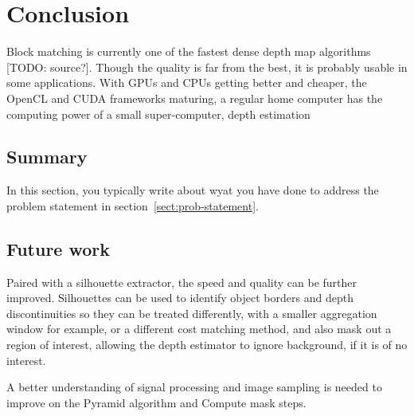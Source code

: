 \chapter{Conclusion}\label{chap:concl}

Block matching is currently one of the fastest dense depth map algorithms
[TODO: source?]. Though the quality is far from the best, it is probably
usable in some applications. With GPUs and CPUs getting better and cheaper,
the OpenCL and CUDA frameworks maturing, a regular home computer has the
computing power of a small super-computer, depth estimation

\section{Summary}

In this section, you typically write about wyat you have done to address the
problem statement in section~\ref{sect:prob-statement}.



\section{Future work}

Paired with a silhouette extractor, the speed and quality can be further
improved. Silhouettes can be used to identify object borders and depth
discontinuities so they can be treated differently, with a smaller aggregation
window for example, or a different cost matching method, and also mask out a
region of interest, allowing the depth estimator to ignore background, if it
is of no interest.

A better understanding of signal processing and image sampling is needed to
improve on the Pyramid algorithm and Compute mask steps.
